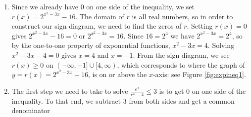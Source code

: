 {
\begin{enumerate}

\item  Since we already have $0$ on one side of the inequality, we set $r(x) = 2^{x^2-3x} - 16$.  The domain of $r$ is all real numbers, so in order to construct our sign diagram, we need to find the zeros of $r$.  Setting $r(x) = 0$ gives $2^{x^2-3x} - 16 = 0$ or $2^{x^2-3x} = 16$.  Since $16 = 2^{4}$ we have $2^{x^2-3x} = 2^{4}$, so by the one-to-one property of exponential functions, $x^2 -3x = 4$.  Solving $x^2 -3x - 4 = 0$ gives $x=4$ and $x=-1$.  From the sign diagram, we see $r(x) \geq 0$ on $(-\infty, -1] \cup [4, \infty)$, which corresponds to where the graph of  $y=r(x) = 2^{x^2-3x} - 16$, is on or above the $x$-axis: see Figure \ref{fig:expineq1}.


\item The first step we need to take to solve  $\frac{e^{x}}{e^{x}-4} \leq 3$ is to get $0$ on one side of the inequality. To that end, we subtract $3$ from both sides and get a common denominator


\setlength{\extrarowheight}{12pt}
\[ \begin{array}{rclr}


\end{array}\]
\end{enumerate}}
